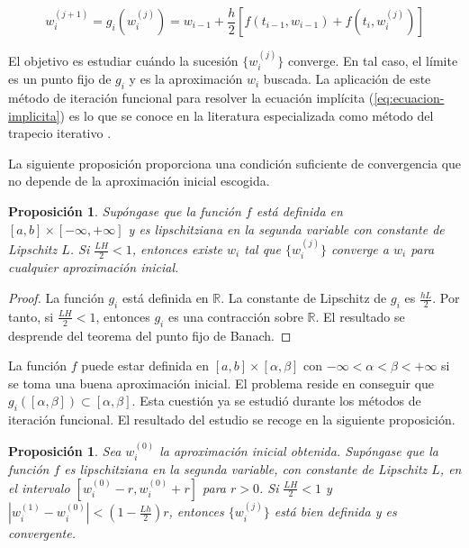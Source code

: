 \documentclass{article}
\theoremstyle{theorem-style}  %
\newtheorem{proposition}[theorem]{Proposición}
\theoremstyle{definition-style}
\theoremstyle{example-style}
\begin{document}
	\begin{equation} \label{eq:ti-def}
		w_{i} ^{(j+1)} = g_i(w_i^{(j)}) = w_{i-1} + \frac{h}{2} \left[f(t_{i-1}, w_{i-1}) + f(t_i, w_{i}^{(j)})\right]
	\end{equation}
	
	El objetivo es estudiar cuándo la sucesión $\{w_{i}^{(j)}\}$ converge. En tal caso, el límite es un punto fijo de $g_i$ y es la aproximación $w_i$ buscada. La aplicación de este método de iteración funcional para resolver la ecuación implícita (\ref{eq:ecuacion-implicita}) es lo que se conoce en la literatura especializada como método del trapecio iterativo \cite{akitson}.
	
	La siguiente proposición proporciona una condición suficiente de convergencia que no depende de la aproximación inicial escogida.
	
	\begin{proposition}
		Supóngase que la función $f$ está definida en $[a,b]\times[-\infty, +\infty]$ y es lipschitziana en la segunda variable con constante de Lipschitz $L$. Si $\frac{LH}{2} < 1$, entonces existe $w_i$ tal que $\{w_i^{(j)}\}$ converge a $w_i$ para cualquier aproximación inicial.
	\end{proposition}
	
	\begin{proof}
		La función $g_i$ está definida en $\mathbb{R}$. La constante de Lipschitz de $g_i$ es $\frac{hL}{2}$. Por tanto, si $\frac{LH}{2} < 1$, entonces $g_i$ es una contracción sobre $\mathbb{R}$. El resultado se desprende del teorema del punto fijo de Banach.
	\end{proof}

	La función $f$ puede estar definida en $[a,b]\times[\alpha, \beta]$ con  $-\infty < \alpha < \beta < +\infty$ si se toma una buena aproximación inicial. El problema reside en conseguir que $g_i([\alpha,\beta]) \subset [\alpha,\beta]$. Esta cuestión ya se estudió durante los métodos de iteración funcional. El resultado del estudio se recoge en la siguiente proposición.
	
	\begin{proposition}
		Sea $w_i^{(0)}$ la aproximación inicial obtenida. Supóngase que la función $f$  es lipschitziana en la segunda variable, con constante de Lipschitz $L$, en el intervalo  $[w_i^{(0)}-r,w_i^{(0)}+r]$ para $r>0$. Si $\frac{LH}{2} < 1$ y $\left|w_i^{(1)} - w_i^{(0)}\right| < (1-\frac{Lh}{2})r$, entonces $\{w_i^{(j)}\}$ está bien definida y es convergente.
	\end{proposition}
	
\end{document}
